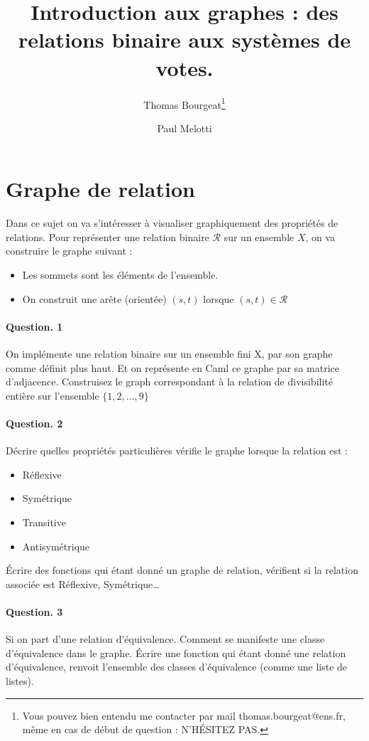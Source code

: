 \documentclass[10pt,a4paper]{article}
\begin{document}
\title{Introduction aux graphes : des relations binaire aux systèmes de votes.}
\author{Thomas Bourgeat\footnote{Vous pouvez bien entendu me contacter par mail thomas.bourgeat@ens.fr, même en cas de début de question : N'HÉSITEZ PAS.}\and Paul Melotti}
\maketitle{}

\section{Graphe de relation}

Dans ce sujet on va s'intéresser à visualiser graphiquement des
propriétés de relations. Pour représenter une relation binaire $\mathcal{R}$ sur un ensemble
$X$, on va construire le graphe suivant : 
\begin{itemize}
\item Les sommets sont les éléments de l'ensemble.
\item On construit une arête (orientée) $(s,t)$ lorsque $(s,t)\in
\mathcal{R}$
\end{itemize}
\paragraph{Question. 1\\}
On implémente une relation binaire sur un ensemble fini X, par son graphe
comme définit plus haut. Et on représente en Caml ce graphe par sa
matrice d'adjacence. Construisez le graph correspondant à la relation de
divisibilité entière sur l'ensemble $\{1,2,\dots,9\}$

\paragraph{Question. 2\\}
Décrire quelles propriétés particulières vérifie le graphe lorsque la
relation est :
\begin{itemize}
\item Réflexive
\item Symétrique
\item Transitive
\item Antisymétrique
\end{itemize}  
Écrire des fonctions qui étant donné un graphe de relation, vérifient si
la relation associée est Réflexive, Symétrique\dots

\paragraph{Question. 3\\}
Si on part d'une relation d'équivalence. Comment se manifeste une classe
d'équivalence dans le graphe. Écrire une fonction qui étant donné une
relation d'équivalence, renvoit l'ensemble des classes d'équivalence
(comme une liste de listes).
\end{document}
